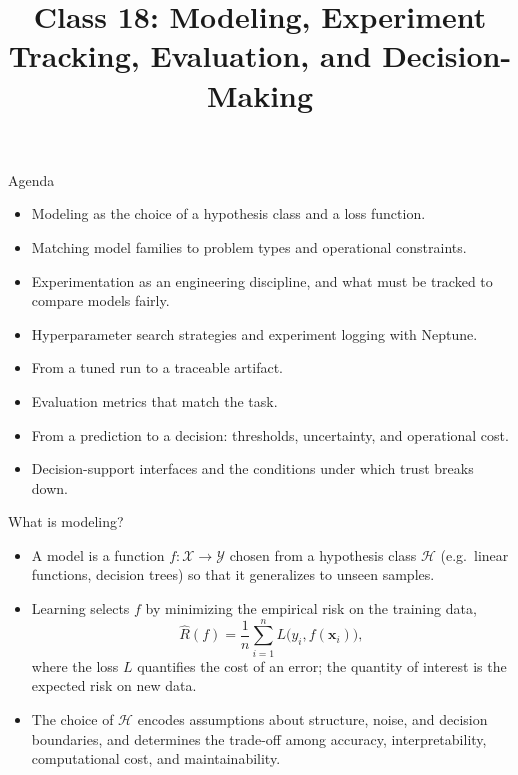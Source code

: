 
\usepackage{amssymb}

\title{Class 18: Modeling, Experiment Tracking, Evaluation, and Decision-Making}
\author{\coursename}
\date{}



\frame{\titlepage \coursefooter}

\begin{frame}{Agenda}
\begin{itemize}
\item Modeling as the choice of a hypothesis class and a loss function.
\item Matching model families to problem types and operational constraints.
\item Experimentation as an engineering discipline, and what must be tracked to compare models fairly.
\item Hyperparameter search strategies and experiment logging with Neptune.
\item From a tuned run to a traceable artifact.
\item Evaluation metrics that match the task.
\item From a prediction to a decision: thresholds, uncertainty, and operational cost.
\item Decision-support interfaces and the conditions under which trust breaks down.
\end{itemize}
\coursefooter
\end{frame}

\begin{frame}{What is modeling?}
\begin{itemize}
\item A model is a function $f: \mathcal{X} \to \mathcal{Y}$ chosen from a hypothesis class $\mathcal{H}$ (e.g.\ linear functions, decision trees) so that it generalizes to unseen samples.
\item Learning selects $f$ by minimizing the empirical risk on the training data,
\[
\hat{R}(f) = \frac{1}{n}\sum_{i=1}^{n} L\big(y_i, f(\mathbf{x}_i)\big),
\]
where the loss $L$ quantifies the cost of an error; the quantity of interest is the expected risk on new data.
\item The choice of $\mathcal{H}$ encodes assumptions about structure, noise, and decision boundaries, and determines the trade-off among accuracy, interpretability, computational cost, and maintainability.
\end{itemize}
\coursefooter
\end{frame}

